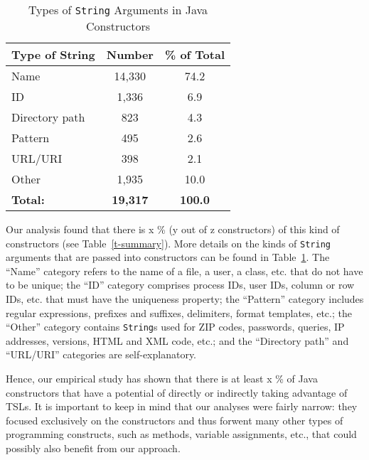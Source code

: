 \begin{table}
   \centering
    \begin{tabular}{l | c | c}
    \bf Type of String & \bf Number & \bf \% of Total \\ \hline
    Name & 14,330 & 74.2 \\
    ID	& 1,336 & 6.9 \\
    Directory path& 823 & 4.3 \\
    Pattern & 495 & 2.6 \\
    URL/URI & 398 & 2.1 \\
    Other & 1,935 & 10.0 \\ \hline
    \bf Total: & \bf 19,317 & \bf 100.0
    \end{tabular}
    \vspace{0.15in}
    \caption{Types of \lstinline{String} Arguments in Java Constructors}
    \label{t-strs-in-constrs}
\end{table}

Our analysis found that there is x \% (y out of z constructors) of this kind of constructors (see Table~\ref{t-summary}). More details on the kinds of \lstinline{String} arguments that are passed into constructors can be found in Table~\ref{t-strs-in-constrs}. The ``Name'' category refers to the name of a file, a user, a class, etc. that do not have to be unique; the ``ID'' category comprises process IDs, user IDs, column or row IDs, etc. that must have the uniqueness property; the ``Pattern'' category includes regular expressions, prefixes and suffixes, delimiters, format templates, etc.; the ``Other'' category contains \lstinline{String}s used for ZIP codes, passwords, queries, IP addresses, versions, HTML and XML code, etc.; and the ``Directory path'' and ``URL/URI'' categories are self-explanatory.

Hence, our empirical study has shown that there is at least x \% of Java constructors that have a potential of directly or indirectly taking advantage of TSLs. It is important to keep in mind that our analyses were fairly narrow: they focused exclusively on the constructors and thus forwent many other types of programming constructs, such as methods, variable assignments, etc., that could possibly also benefit from our approach.

